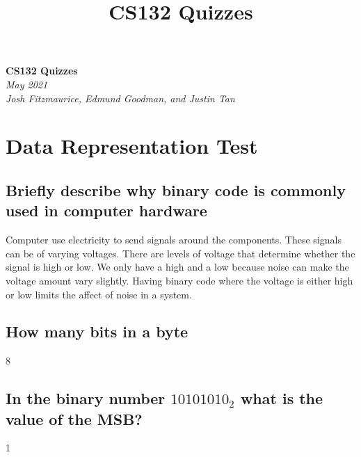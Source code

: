 \documentclass{article}
\title{CS132 Quizzes}
\begin{document}
\begin{center}
    \Huge\textbf{CS132 Quizzes}\\
    \huge\textit{May 2021}\\
    \medskip
    \Large\textit{Josh Fitzmaurice, Edmund Goodman, and Justin Tan}
\end{center}



\section{Data Representation Test}
\subsection{Briefly describe why binary code is commonly used in computer hardware}
Computer use electricity to send signals around the components. These signals can be of varying voltages. There are levels of voltage that determine whether the signal is high or low. We only have a high and a low because noise can make the voltage amount vary slightly. Having binary code where the voltage is either high or low limits the affect of noise in a system.

\subsection{How many bits in a byte}
8

\subsection{In the binary number $10101010_2$ what is the value of the MSB?}
1
\newpage
\end{document}

